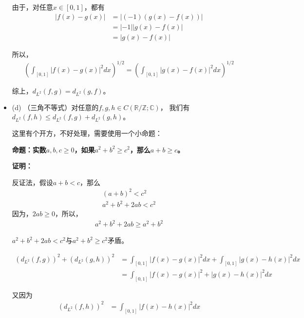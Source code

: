 \documentclass{article}
\begin{document}
\begin{itemize}
        由于，对任意$x \in [0, 1]$，都有
        \begin{align*}
          |f(x) - g(x)| & = |(-1)(g(x) - f(x))| \\
                        & = |-1||g(x) - f(x)|   \\
                        & = |g(x) - f(x)|
        \end{align*}

        所以，
        \begin{align*}
          \left(\int_{[0, 1]} |f(x) - g(x)|^2dx\right)^{1/2} = \left(\int_{[0, 1]} |g(x) - f(x)|^2dx\right)^{1/2}
        \end{align*}

        综上，$d_{L^2}(f, g) = d_{L^2}(g, f)$。

  \item (d) （三角不等式）对任意的$f,g,h \in C(\mathbb{R}/\mathbb{Z};\mathbb{C})$，
        我们有$d_{L^2}(f, h) \leq d_{L^2}(f, g) + d_{L^2}(g, h)$。

        这里有个开方，不好处理，需要使用一个小命题：
        \begin{zremark}
          \textbf{命题：实数$a, b, c \geq 0$，如果$a^2 + b^2 \geq c^2$，那么$a + b \geq c$。}

          \textbf{证明：}

          反证法，假设$a + b < c$，那么
          \begin{align*}
            (a + b)^2 < c^2 \\
            a^2 + b^2 + 2ab < c^2
          \end{align*}
          因为，$2ab \geq 0$，所以，
          \begin{align*}
            a^2 + b^2 + 2ab \geq a^2 + b^2
          \end{align*}

          $a^2 + b^2 + 2ab < c^2$与$a^2 + b^2 \geq c^2$矛盾。
        \end{zremark}

        \begin{align*}
          (d_{L^2}(f, g))^2 + (d_{L^2}(g, h))^2
           & = \int_{[0, 1]} |f(x) - g(x)|^2dx + \int_{[0, 1]} |g(x) - h(x)|^2dx \\
           & = \int_{[0, 1]} |f(x) - g(x)|^2 + |g(x) - h(x)|^2dx
        \end{align*}

        又因为
        \begin{align*}
          (d_{L^2}(f, h))^2
           & = \int_{[0, 1]} |f(x) - h(x)|^2dx
        \end{align*}


\end{itemize}
\end{document}

